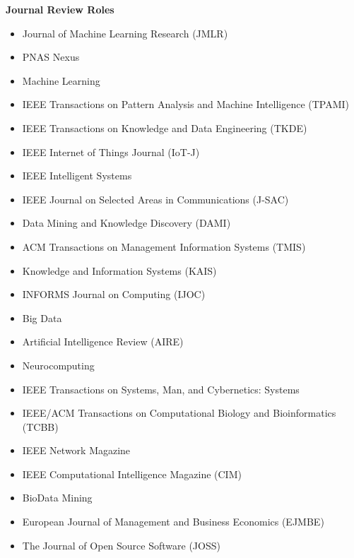 \documentclass[margin,line,pifont,palatino,courier]{res}
\begin{document}
\begin{resume}
\textbf{Journal Review Roles}
\begin{itemize}[leftmargin=*]
\setlength\itemsep{-0.1em}
    \item Journal of Machine Learning Research (JMLR)
    \item PNAS Nexus
    \item Machine Learning
    \item IEEE Transactions on Pattern Analysis and Machine Intelligence (TPAMI)
    \item IEEE Transactions on Knowledge and Data Engineering (TKDE)
    \item IEEE Internet of Things Journal (IoT-J)
    \item IEEE Intelligent Systems
    \item IEEE Journal on Selected Areas in Communications (J-SAC)
    \item Data Mining and Knowledge Discovery (DAMI)
    \item ACM Transactions on Management Information Systems (TMIS)
    \item Knowledge and Information Systems (KAIS)
    \item INFORMS Journal on Computing (IJOC)
    \item Big Data
    \item Artificial Intelligence Review (AIRE)
    \item Neurocomputing
    \item IEEE Transactions on Systems, Man, and Cybernetics: Systems
    \item IEEE/ACM Transactions on Computational Biology and Bioinformatics (TCBB)
    \item IEEE Network Magazine
    \item IEEE Computational Intelligence Magazine (CIM)
    \item BioData Mining
    \item European Journal of Management and Business Economics (EJMBE)
    \item The Journal of Open Source Software (JOSS)
\end{itemize}

\clearpage
\newpage




\end{resume}
\end{document}
